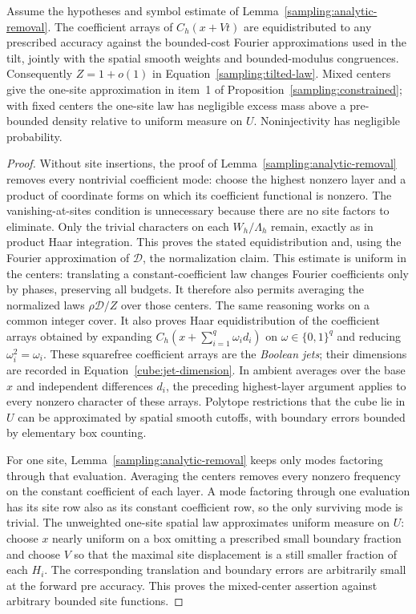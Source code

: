 \begin{corollary}
\label{sampling:normalization}
Assume the hypotheses and symbol estimate of
Lemma~\ref{sampling:analytic-removal}.  The coefficient arrays of
$C_h(x+Vt)$ are equidistributed to any prescribed accuracy against the
bounded-cost Fourier approximations used in the tilt, jointly with the
spatial smooth weights and bounded-modulus congruences.  Consequently
$Z=1+o(1)$ in Equation~\eqref{sampling:tilted-law}.  Mixed centers give the
one-site approximation in item~1 of
Proposition~\ref{sampling:constrained}; with fixed centers the one-site
law has negligible excess mass above a pre-bounded density relative to
uniform measure on $U$.  Noninjectivity has negligible probability.
\end{corollary}
\begin{proof}
Without site insertions, the proof of
Lemma~\ref{sampling:analytic-removal} removes every nontrivial coefficient
mode: choose the highest nonzero layer and a product of coordinate forms
on which its coefficient functional is nonzero.  The vanishing-at-sites
condition is unnecessary because there are no site factors to eliminate.
Only the trivial characters on each $W_h/\Lambda_h$ remain, exactly as in
product Haar integration.  This proves the stated equidistribution and,
using the Fourier approximation of $\mathcal D$, the normalization claim.
This estimate is uniform in the centers: translating a constant-coefficient
law changes Fourier coefficients only by phases, preserving all budgets.
It therefore also permits averaging the normalized laws $\rho\mathcal D/Z$
over those centers.
The same reasoning works on a common integer cover.  It also proves Haar
equidistribution of the coefficient arrays obtained by expanding
$C_h(x+\sum_{i=1}^q\omega_i d_i)$ on $\omega\in\{0,1\}^q$ and
reducing $\omega_i^2=\omega_i$.  These squarefree coefficient arrays
are the \emph{Boolean jets}; their dimensions are recorded in
Equation~\eqref{cube:jet-dimension}.  In ambient averages over the base
$x$ and independent differences $d_i$, the preceding highest-layer
argument applies to every nonzero character of these arrays.
Polytope restrictions
that the cube lie in $U$ can be approximated by spatial smooth cutoffs,
with boundary errors bounded by elementary box counting.

For one site, Lemma~\ref{sampling:analytic-removal} keeps only modes
factoring through that evaluation.  Averaging the centers removes every
nonzero frequency on the constant coefficient of each layer.  A mode
factoring through one evaluation has its site row also as its constant
coefficient row, so the only surviving mode is trivial.  The unweighted
one-site spatial law approximates uniform measure on $U$: choose $x$
nearly uniform on a box omitting a prescribed small boundary fraction and
choose $V$ so that the maximal site displacement is a still smaller fraction
of each $H_i$.  The corresponding translation and boundary errors are
arbitrarily small at the forward pre accuracy.  This proves the mixed-center
assertion against arbitrary bounded site functions.


\end{proof}
